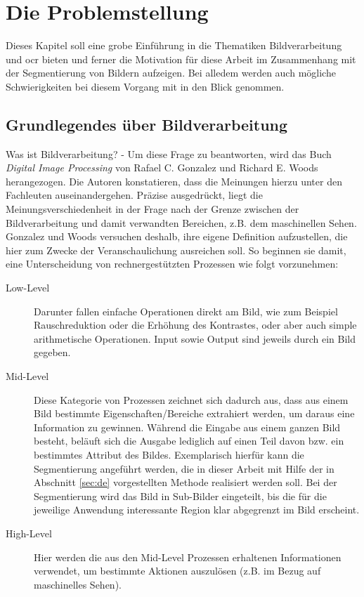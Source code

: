 \chapter{Die Problemstellung}
\label{sec:prob}
	
	Dieses Kapitel soll eine grobe Einführung in die Thematiken Bildverarbeitung und \gls{ocr} bieten und ferner die Motivation für diese Arbeit im Zusammenhang mit der Segmentierung von Bildern aufzeigen. Bei alledem werden auch mögliche Schwierigkeiten bei diesem Vorgang mit in den Blick genommen.
	
	\section{Grundlegendes über Bildverarbeitung}
	\label{sec:bild-basics}
	
		Was ist Bildverarbeitung? - Um diese Frage zu beantworten, wird das Buch \textit{Digital Image Processing} von Rafael C. Gonzalez und Richard E. Woods \cite[S. 1--3]{gonzalez-woods} herangezogen. Die Autoren konstatieren, dass die Meinungen hierzu unter den Fachleuten auseinandergehen. Präzise ausgedrückt, liegt die Meinungsverschiedenheit in der Frage nach der Grenze zwischen der Bildverarbeitung und damit verwandten Bereichen, z.B. dem maschinellen Sehen. Gonzalez und Woods versuchen deshalb, ihre eigene Definition aufzustellen, die hier zum Zwecke der Veranschaulichung ausreichen soll. So beginnen sie damit, eine Unterscheidung von rechnergestützten Prozessen wie folgt vorzunehmen: 
		\begin{description}
			\item[Low-Level] Darunter fallen einfache Operationen direkt am Bild, wie zum Beispiel Rauschreduktion oder die Erhöhung des Kontrastes, oder aber auch simple arithmetische Operationen. Input sowie Output sind jeweils durch ein Bild gegeben.
			\item[Mid-Level] Diese Kategorie von Prozessen zeichnet sich dadurch aus, dass aus einem Bild bestimmte Eigenschaften/Bereiche extrahiert werden, um daraus eine Information zu gewinnen. Während die Eingabe aus einem ganzen Bild besteht, beläuft sich die Ausgabe lediglich auf einen Teil davon bzw. ein bestimmtes Attribut des Bildes. Exemplarisch hierfür kann die Segmentierung angeführt werden, die in dieser Arbeit mit Hilfe der in Abschnitt \ref{sec:de} vorgestellten Methode realisiert werden soll. Bei der Segmentierung wird das Bild in Sub-Bilder eingeteilt, bis die für die jeweilige Anwendung interessante Region klar abgegrenzt im Bild erscheint.
			\item[High-Level] Hier werden die aus den Mid-Level Prozessen erhaltenen Informationen verwendet, um bestimmte Aktionen auszulösen (z.B. im Bezug auf maschinelles Sehen).
		\end{description}
	
